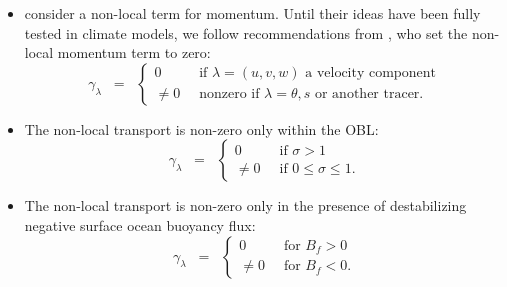 \begin{itemize}

\item \cite{Smyth_etal2002} consider a non-local term for momentum.
  Until their ideas have been fully tested in climate models, we
  follow recommendations from \citep{LargeKPP}, who set the non-local
  momentum term to zero:
\begin{equation}
 \gamma_{\lambda} \; \; = \; \; 
\left\{
 \begin{array}{ll}
  0 \; \;  &\mbox{if $\lambda = (u,v,w)$ a velocity component}
 \\
  \ne 0 \; \; &\mbox{nonzero if $\lambda = \theta,s$ or another tracer.}
  \end{array}
 \right.
\end{equation}

  \item The non-local transport is non-zero only within the OBL:  
\begin{equation}
 \gamma_{\lambda} \; \; = \; \; 
  \left\{ 
  \begin{array}{ll}
   0 \; \; &\mbox{if $\sigma > 1$}
   \\ 
   \ne 0  \; \; &\mbox{if $0 \le \sigma \le 1$.}
  \end{array}
 \right.
\end{equation}

  \item The non-local transport is non-zero only in the presence of
    destabilizing negative surface ocean buoyancy flux:
\begin{equation}
 \gamma_{\lambda} \; \; = \; \; 
  \left\{ 
  \begin{array}{ll}
   0 \; \; &\mbox{for $B_{f} > 0$}
   \\ 
   \ne 0 \; \; &\mbox{for $B_{f} < 0$.}
  \end{array}
 \right.
\end{equation}



\end{itemize}
